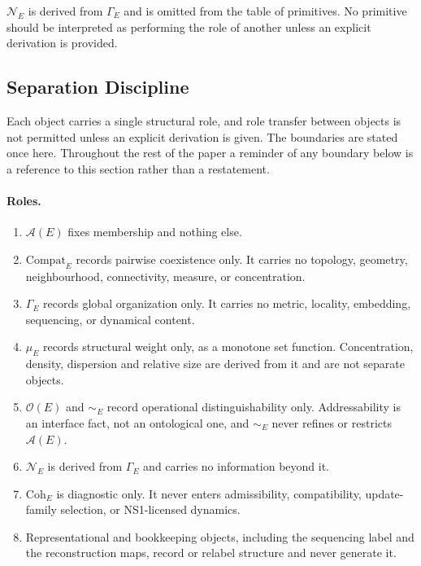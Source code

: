 \documentclass[aps,prx,onecolumn,11pt]{revtex4-2}
\theoremstyle{plain}
\theoremstyle{definition}
\theoremstyle{remark}
\begin{document}
\(\mathcal{N}_E\) is derived from \(\Gamma_E\) and is omitted from the
table of primitives. No primitive should be interpreted as performing
the role of another unless an explicit derivation is provided.

\subsection{Separation Discipline}
\label{sec:separation_discipline}

Each object carries a single structural role, and role transfer between
objects is not permitted unless an explicit derivation is given. The
boundaries are stated once here. Throughout the rest of the paper a
reminder of any boundary below is a reference to this section rather
than a restatement.

\paragraph{Roles.}
\begin{enumerate}[label=(\roman*), leftmargin=2.4em]
\item \(\mathcal{A}(E)\) fixes membership and nothing else.
\item \(\mathrm{Compat}_E\) records pairwise coexistence only. It carries
no topology, geometry, neighbourhood, connectivity, measure, or
concentration.
\item \(\Gamma_E\) records global organization only. It carries no
metric, locality, embedding, sequencing, or dynamical content.
\item \(\mu_E\) records structural weight only, as a monotone set
function. Concentration, density, dispersion and relative size are
derived from it and are not separate objects.
\item \(\mathcal{O}(E)\) and \(\sim_E\) record operational
distinguishability only. Addressability is an interface fact, not an
ontological one, and \(\sim_E\) never refines or restricts
\(\mathcal{A}(E)\).
\item \(\mathcal{N}_E\) is derived from \(\Gamma_E\) and carries no
information beyond it.
\item \(\mathrm{Coh}_E\) is diagnostic only. It never enters
admissibility, compatibility, update-family selection, or NS1-licensed
dynamics.
\item Representational and bookkeeping objects, including the sequencing
label and the reconstruction maps, record or relabel structure and
never generate it.
\end{enumerate}
\end{document}
